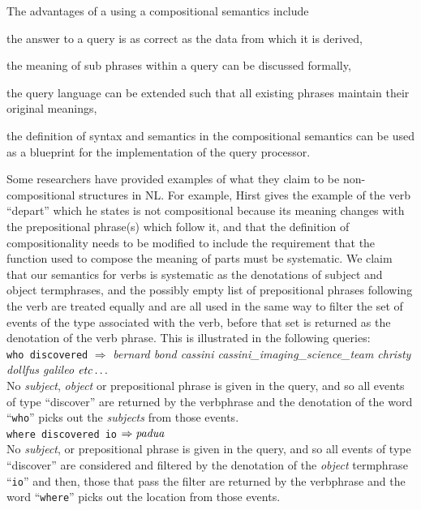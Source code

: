 \documentclass[../main.tex]{subfiles}
\begin{document}
\begin{refsection}
The advantages of a using a compositional semantics include
\begin{inparaenum}[1)]
	\item the answer to a query is as correct as the data from which it is derived,
	\item  the meaning of sub phrases within a query can be discussed formally,
	\item the query language can be extended such that all existing phrases maintain their original meanings,
	\item the definition of syntax and semantics in the compositional semantics can be used as a blueprint for the implementation of the query processor.
\end{inparaenum}

Some researchers have provided examples of what they claim to be non-compositional structures in NL. For example, Hirst \cite{hirst1992semantic} gives the example of the verb ``depart'' which he states is not compositional because its meaning changes with the prepositional phrase(s) which follow it, and that the definition of compositionality needs to be modified to include the requirement that the function used to compose the meaning of parts must be systematic. We claim that our semantics for verbs is systematic as the denotations of subject and object termphrases, and the possibly empty list of prepositional phrases following the verb are treated equally and are all used in the same way to filter the set of events of the type associated with the verb, before that set is returned as the denotation of the verb phrase. This is illustrated in the following queries: \\

\noindent \texttt{who discovered} $\Rightarrow$ \textit{bernard bond cassini cassini\_imaging\_science\_team christy dollfus galileo} $\operatorname{\mathit{etc\ldots}}$ \\

No \textit{subject}, \textit{object} or prepositional phrase is given in the query, and so all events of type ``discover'' are returned by the verbphrase and the denotation of the word ``\texttt{who}'' picks out the \textit{subjects} from those events. \\

\noindent \texttt{where discovered io} $\Rightarrow \operatorname{\mathit{padua}}$ \\

No \textit{subject}, or prepositional phrase is given in the query, and so all events of type ``discover'' are considered and filtered by the denotation of the \textit{object} termphrase ``\texttt{io}'' and then, those that pass the filter are returned by the verbphrase and the word ``\texttt{where}'' picks out the location from those events. \\ %


\end{refsection}
\end{document}
